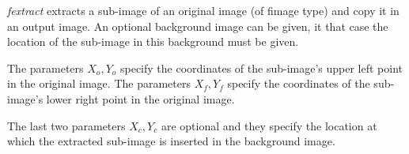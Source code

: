{\em fextract} extracts a sub-image of an original image (of fimage type) and copy it in an output image. An optional background image can be given, it that
case the location of the sub-image in this background must be given. 

The parameters $X_o,Y_o$ specify the coordinates of the sub-image's upper left point in the original image.
The parameters $X_f,Y_f$ specify the coordinates of the sub-image's lower right point in the original image.

The last two parameters $X_c,Y_c$ are optional and they specify the location at which the extracted sub-image is inserted in the background image.

